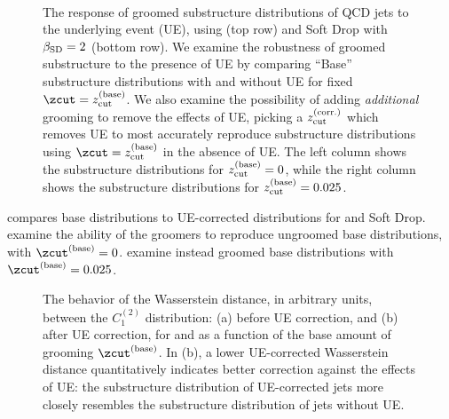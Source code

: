 \begin{figure}[p]
\centering
    \\
\caption{
The response of groomed substructure distributions of QCD jets to the underlying event (UE), using  (top row) and Soft Drop with \(\beta_{\rm SD} = 2\) (bottom row).
%
We examine the robustness of groomed substructure to the presence of UE by comparing ``Base'' substructure distributions with and without UE for fixed \(\zcut = z^{(\rm base)}_{\rm cut}\).
%
We also examine the possibility of adding \textit{additional} grooming to remove the effects of UE, picking a \(z^{(\rm corr.)}_{\rm cut}\) which removes UE to most accurately reproduce substructure distributions using \(\zcut = z^{(\rm base)}_{\rm cut}\) in the absence of UE.
%
The left column shows the substructure distributions for \(z^{(\rm base)}_{\rm cut} = 0\), while the right column shows the substructure distributions for \(z^{(\rm base)}_{\rm cut} = 0.025\).
}
\label{fig:ue}
\end{figure}


 compares base distributions to UE-corrected distributions for  and Soft Drop.
%
 examine the ability of the groomers to reproduce ungroomed base distributions, with \(\zcut^{(\rm base)} = 0\).
%
 examine instead groomed base distributions with \(\zcut^{(\rm base)} = 0.025\).

\begin{figure}[]
\centerline{
}
\caption{
    The behavior of the Wasserstein distance, in arbitrary units, between the \(C_1^{(2)}\) distribution: (a) before UE correction, and (b) after UE correction, for  and  as a function of the base amount of grooming \(\zcut^{(\rm base)}\).
    In (b), a lower UE-corrected Wasserstein distance quantitatively indicates better correction against the effects of UE:
    the substructure distribution of UE-corrected jets more closely resembles the substructure distribution of jets without UE.
}
\label{fig:ue_2}
\centering
\end{figure}


